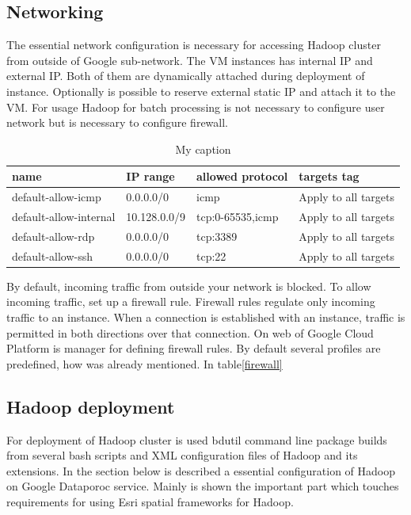 \documentclass[a4paper,12pt,oneside]{report}
\begin{document}
\subsection{Networking}
The essential network configuration is necessary  for accessing Hadoop cluster from outside of Google sub-network. The VM instances has internal IP and external IP. Both of them are dynamically attached during deployment of instance. Optionally is possible to reserve external static IP and attach it to the VM.  For usage Hadoop for batch processing is not necessary to configure user network but is necessary to configure firewall. 

\begin{table}[!htbp]
\centering
\begin{scriptsize}
\begin{tabular}{@{}|l|l|l|l|@{}}
\toprule
name                   & IP range     & allowed protocol & targets tag          \\ \midrule  \midrule
default-allow-icmp     & 0.0.0.0/0    & icmp             & Apply to all targets \\ \midrule
default-allow-internal & 10.128.0.0/9 & tcp:0-65535,icmp & Apply to all targets \\ \midrule
default-allow-rdp      & 0.0.0.0/0    & tcp:3389         & Apply to all targets \\ \midrule
default-allow-ssh      & 0.0.0.0/0    & tcp:22           & Apply to all targets \\ \bottomrule
\end{tabular}
\end{scriptsize}
\caption{My caption}
\label{my-label}
\end{table}
By default, incoming traffic from outside your network is blocked. To allow incoming traffic, set up a firewall rule. Firewall rules regulate only incoming traffic to an instance. When a connection is established with an instance, traffic is permitted in both directions over that connection. On web of Google Cloud Platform is manager for defining firewall rules. By default several profiles are predefined, how was already mentioned. In table\ref{firewall}



        \subsection{Hadoop deployment}
For deployment of Hadoop cluster is used bdutil command line package builds from several bash scripts 
and XML configuration files of Hadoop and its extensions. In the section below is described a essential 
configuration of Hadoop on Google Dataporoc 
service. Mainly is shown the important part which touches requirements for using Esri spatial frameworks for Hadoop. 
\end{document}
